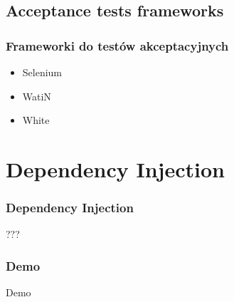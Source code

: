 \documentclass[slidestop,compress,mathserif]{beamer}
\begin{document}
\subsection{Acceptance tests frameworks}
\begin{frame}
	\frametitle{Frameworki do testów akceptacyjnych}
	\begin{itemize}
		\item{Selenium}
		\pause \item{WatiN}
		\pause \item{White}
	\end{itemize}
\end{frame}

\section{Dependency Injection}
\begin{frame}
	\frametitle{Dependency Injection}
	???
\end{frame}
	
	
\begin{frame}
	\frametitle{Demo}
	\begin{center}
		\huge{Demo}
	\end{center}
\end{frame}
	
	
\end{document}
